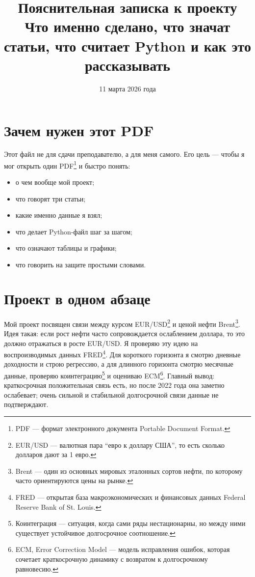 \documentclass[a4paper,12pt]{article}
\title{Пояснительная записка к проекту\\[0.3em]
\large Что именно сделано, что значат статьи, что считает Python и как это рассказывать}
\author{}
\date{11 марта 2026 года}
\begin{document}
\maketitle
\tableofcontents

\section{Зачем нужен этот PDF}
Этот файл не для сдачи преподавателю, а для меня самого. Его цель --- чтобы я мог открыть один PDF\footnote{PDF --- формат электронного документа Portable Document Format.} и быстро понять:
\begin{itemize}
    \item о чем вообще мой проект;
    \item что говорят три статьи;
    \item какие именно данные я взял;
    \item что делает Python-файл шаг за шагом;
    \item что означают таблицы и графики;
    \item что говорить на защите простыми словами.
\end{itemize}

\section{Проект в одном абзаце}
Мой проект посвящен связи между курсом EUR/USD\footnote{EUR/USD --- валютная пара ``евро к доллару США'', то есть сколько долларов дают за 1 евро.} и ценой нефти Brent\footnote{Brent --- один из основных мировых эталонных сортов нефти, по которому часто ориентируются цены на рынке.}. Идея такая: если рост нефти часто сопровождается ослаблением доллара, то это должно отражаться в росте EUR/USD. Я проверяю эту идею на воспроизводимых данных FRED\footnote{FRED --- открытая база макроэкономических и финансовых данных Federal Reserve Bank of St. Louis.}. Для короткого горизонта я смотрю дневные доходности и строю регрессию, а для длинного горизонта смотрю месячные данные, проверяю коинтеграцию\footnote{Коинтеграция --- ситуация, когда сами ряды нестационарны, но между ними существует устойчивое долгосрочное соотношение.} и оцениваю ECM\footnote{ECM, Error Correction Model --- модель исправления ошибок, которая сочетает краткосрочную динамику с возвратом к долгосрочному равновесию.}. Главный вывод: краткосрочная положительная связь есть, но после 2022 года она заметно ослабевает; очень сильной и стабильной долгосрочной связи данные не подтверждают.
\end{document}
